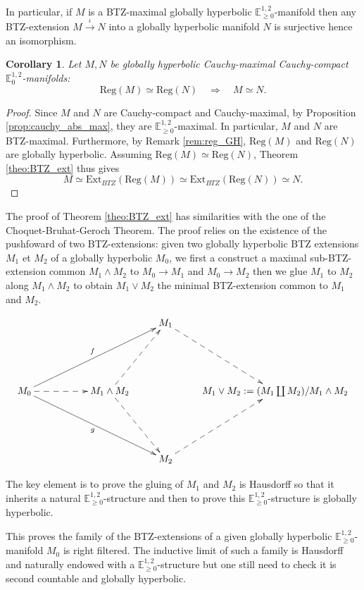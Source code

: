 \documentclass[a4paper,12pt]{article}
\newcommand{\mass}[1]{{\mathbb E}^{1,2}_{#1}}
\def\Reg{\mathrm{Reg}}
\def\BTZext{\mathrm{Ext}_{BTZ}}
\def\reg{\Reg}
\newtheorem{corou}[lemou]{Corollary}
\begin{document}
      In particular, if $M$ is a BTZ-maximal globally hyperbolic $\mass{\geq0}$-manifold then any BTZ-extension $M\xrightarrow{\iota}N$ into a globally hyperbolic manifold $N$ is surjective hence an isomorphism.
   \begin{corou}\label{cor:common_reg} Let $M,N$ be globally hyperbolic Cauchy-maximal Cauchy-com\-pact $\mass{0}$-manifolds: 
   $$\reg(M)\simeq \reg(N) \quad \Rightarrow{} \quad M\simeq N.$$
   \end{corou}
    \begin{proof}
   Since $M$ and $N$ are Cauchy-compact and Cauchy-maximal, by Proposition \ref{prop:cauchy_abs_max}, they are $\mass{\geq0}$-maximal. In particular, $M$ and $N$ are BTZ-maximal. Furthermore, by Remark \ref{rem:reg_GH}, $\reg(M)$ and $\reg(N)$ are globally hyperbolic. Assuming $\reg(M)\simeq \reg(N)$, Theorem \ref{theo:BTZ_ext} thus gives $$M \simeq \BTZext(\reg(M)) \simeq \BTZext(\reg(N)) \simeq N.$$ 
   \end{proof}
      The proof of Theorem \ref{theo:BTZ_ext} has similarities with the one of the Choquet-Bruhat-Geroch Theorem. The proof relies on the existence of the pushfoward
of two BTZ-extensions: 
given two globally hyperbolic BTZ extensions $M_1$ et $M_2$
		of a globally hyperbolic $M_0$, we first a construct a maximal sub-BTZ-extension common $M_1\wedge M_2$ to  $M_0\rightarrow M_1$ and
		 $M_0\rightarrow M_2$ then we glue $M_1$ to $M_2$ along $M_1\wedge M_2$ to obtain $M_1\vee M_2$ the minimal BTZ-extension common to $M_1$ and $M_2$. 
	
		
		 $$
			\xymatrix{
				&&& M_1\ar@{-->}[ddr] &\\ &&&&\\
			M_0\ar[ddrrr]_g\ar[uurrr]^f\ar@{-->}[rr]&&M_1\wedge M_2\ar@{-->}[uur]\ar@{-->}[ddr]& &M_1\vee M_2:=(M_1\coprod M_2)/M_1\wedge M_2\\ &&&&\\
			&&&M_2\ar@{-->}[uur]&
			}
		$$
	 
		 The key element is to prove the gluing of $M_1$ and $M_2$ is Hausdorff so that it inherits a natural $\mass{\geq0}$-structure and then to prove this  $\mass{\geq0}$-structure is globally hyperbolic. 
		
		This proves the family of the BTZ-extensions of a given globally hyperbolic $\mass{\geq0}$-manifold $M_0$ is right filtered. The inductive limit of such a family is 
		Hausdorff and naturally endowed with a $\mass{\geq0}$-structure but one still need to check it is second countable and globally hyperbolic.
		
\end{document}
